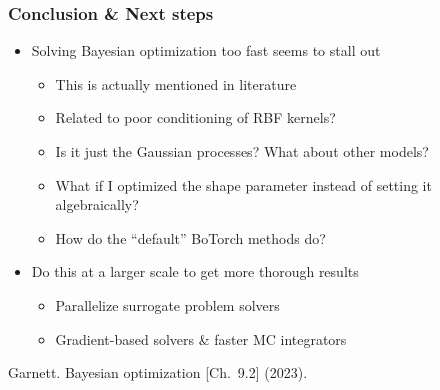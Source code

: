 \documentclass[aspectratio=169]{beamer}
\begin{document}
\begin{frame}\frametitle{Conclusion \& Next steps}
\begin{itemize}
\item Solving Bayesian optimization too fast seems to stall out
\begin{itemize}
\item This is actually mentioned in literature
\item Related to poor conditioning of RBF kernels?
\item Is it just the Gaussian processes? What about other models?
\item What if I optimized the shape parameter instead of setting it algebraically?
\item How do the ``default'' BoTorch methods do?
\end{itemize}
\item Do this at a larger scale to get more thorough results
\begin{itemize}
\item Parallelize surrogate problem solvers
\item Gradient-based solvers \& faster MC integrators
\end{itemize}
\end{itemize}

\vfill

{\tiny\sl

Garnett. Bayesian optimization [Ch.\ 9.2] (2023).

}
\end{frame}
\end{document}
